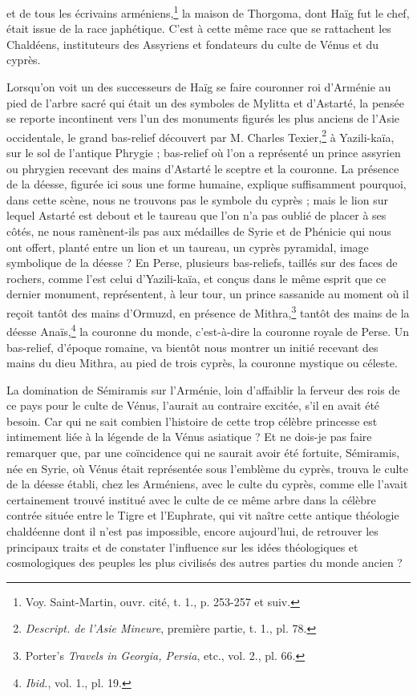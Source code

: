 \documentclass[a4paper, 11pt, oneside, polutonikogreek, french]{article}
\begin{document}
et de tous les écrivains arméniens,\footnote{Voy. Saint-Martin, ouvr. cité, t. 1., p. 253-257 et suiv.} la maison de Thorgoma, dont Haïg fut le chef, était issue de la race japhétique. C'est à cette même race que se rattachent les Chaldéens, instituteurs des Assyriens et fondateurs du culte de Vénus et du cyprès.

Lorsqu'on voit un des successeurs de Haïg se faire couronner roi d'Arménie au pied de l'arbre sacré qui était un des symboles de Mylitta et d'Astarté, la pensée se reporte incontinent vers l'un des monuments figurés les plus anciens de l'Asie occidentale, le grand bas-relief découvert par M. Charles Texier,\footnote{\emph{Descript. de l'Asie Mineure}, première partie, t. 1., pl. 78.} à Yazili-kaïa, sur le sol de l'antique Phrygie ; bas-relief où l'on a représenté un prince assyrien ou phrygien recevant des mains d'Astarté le sceptre et la couronne. La présence de la déesse, figurée ici sous une forme humaine, explique suffisamment pourquoi, dans cette scène, nous ne trouvons pas le symbole du cyprès ; mais le lion sur lequel Astarté est debout et le taureau que l'on n'a pas oublié de placer à ses côtés, ne nous ramènent-ils pas aux médailles de Syrie et de Phénicie qui nous ont offert, planté entre un lion et un taureau, un cyprès pyramidal, image symbolique de la déesse ? En Perse, plusieurs bas-reliefs, taillés sur des faces de rochers, comme l'est celui d'Yazili-kaïa, et conçus dans le même esprit que ce dernier monument, représentent, à leur tour, un prince sassanide au moment où il reçoit tantôt des mains d'Ormuzd, en présence de Mithra,\footnote{Porter's \emph{Travels in Georgia, Persia}, etc., vol. 2., pl. 66.} tantôt des mains de la déesse Anaïs,\footnote{\emph{Ibid.}, vol. 1., pl. 19.} la couronne du monde, c'est-à-dire la couronne royale de Perse. Un bas-relief, d'époque romaine, va bientôt nous montrer un initié recevant des mains du dieu Mithra, au pied de trois cyprès, la couronne mystique ou céleste.

La domination de Sémiramis sur l'Arménie, loin d'affaiblir la ferveur des rois de ce pays pour le culte de Vénus, l'aurait au contraire excitée, s'il en avait été besoin. Car qui ne sait combien l'histoire de cette trop célèbre princesse est intimement liée à la légende de la Vénus asiatique ? Et ne dois-je pas faire remarquer que, par une coïncidence qui ne saurait avoir été fortuite, Sémiramis, née en Syrie, où Vénus était représentée sous l'emblème du cyprès, trouva le culte de la déesse établi, chez les Arméniens, avec le culte du cyprès, comme elle l'avait certainement trouvé institué avec le culte de ce même arbre dans la célèbre contrée située entre le Tigre et l'Euphrate, qui vit naître cette antique théologie chaldéenne dont il n'est pas impossible, encore aujourd'hui, de retrouver les principaux traits et de constater l'influence sur les idées théologiques et cosmologiques des peuples les plus civilisés des autres parties du monde ancien ?
\end{document}
